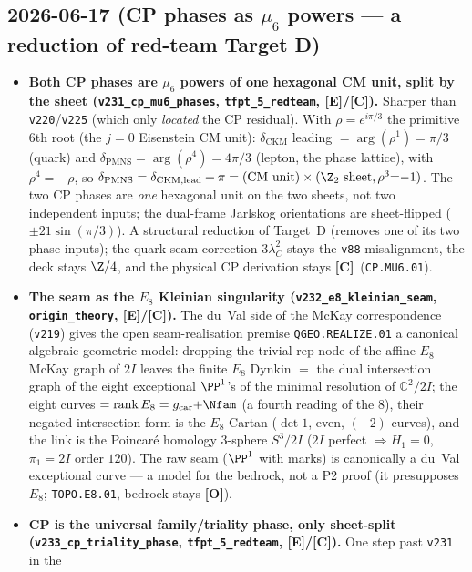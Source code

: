 \documentclass[11pt]{article}
\providecommand{\mE}{\textbf{[E]}}\providecommand{\mC}{\textbf{[C]}}
\providecommand{\mO}{\textbf{[O]}}\providecommand{\mX}{\textbf{[X]}}
\providecommand{\vref}[1]{\texttt{#1}}
\begin{document}
\subsection*{2026-06-17 (CP phases as $\mu_6$ powers --- a reduction of red-team Target D)}
\begin{itemize}
\item \textbf{Both CP phases are $\mu_6$ powers of one hexagonal CM unit, split by the sheet
  (\texttt{v231\_cp\_mu6\_phases}, \texttt{tfpt\_5\_redteam}, \mE/\mC).} Sharper than \vref{v220}/\vref{v225}
  (which only \emph{located} the CP residual). With $\rho=e^{i\pi/3}$ the primitive $6$th root (the $j{=}0$
  Eisenstein CM unit): $\delta_{\mathrm{CKM}}$ leading $=\arg(\rho^1)=\pi/3$ (quark) and
  $\delta_{\mathrm{PMNS}}=\arg(\rho^4)=4\pi/3$ (lepton, the phase lattice), with $\rho^4=-\rho$, so
  $\delta_{\mathrm{PMNS}}=\delta_{\mathrm{CKM,lead}}+\pi=(\text{CM unit})\times(\Z_2\text{ sheet}, \rho^3{=}{-}1)$.
  The two CP phases are \emph{one} hexagonal unit on the two sheets, not two independent inputs; the
  dual-frame Jarlskog orientations are sheet-flipped ($\pm21\sin(\pi/3)$). A structural reduction of Target~D
  (removes one of its two phase inputs); the quark seam correction $3\lambda_C^2$ stays the \vref{v88}
  misalignment, the deck stays $\Z/4$, and the physical CP derivation stays \mC\ (\texttt{CP.MU6.01}).
\item \textbf{The seam as the $E_8$ Kleinian singularity (\texttt{v232\_e8\_kleinian\_seam},
  \texttt{origin\_theory}, \mE/\mC).} The du~Val side of the McKay correspondence (\vref{v219}) gives the
  open seam-realisation premise \texttt{QGEO.REALIZE.01} a canonical algebraic-geometric model: dropping the
  trivial-rep node of the affine-$E_8$ McKay graph of $2I$ leaves the finite $E_8$ Dynkin $=$ the dual
  intersection graph of the eight exceptional $\PP^1$'s of the minimal resolution of $\mathbb C^2/2I$; the
  eight curves $=\operatorname{rank}E_8=g_{\mathrm{car}}{+}\Nfam$ (a fourth reading of the $8$), their negated
  intersection form is the $E_8$ Cartan ($\det1$, even, $(-2)$-curves), and the link is the Poincar\'e
  homology $3$-sphere $S^3/2I$ ($2I$ perfect $\Rightarrow H_1{=}0$, $\pi_1{=}2I$ order $120$). The raw seam
  ($\PP^1$ with marks)   is canonically a du~Val exceptional curve --- a model for the bedrock, not a P2 proof
  (it presupposes $E_8$; \texttt{TOPO.E8.01}, bedrock stays \mO).
\item \textbf{CP is the universal family/triality phase, only sheet-split
  (\texttt{v233\_cp\_triality\_phase}, \texttt{tfpt\_5\_redteam}, \mE/\mC).} One step past \vref{v231} in the

\end{itemize}
\end{document}
